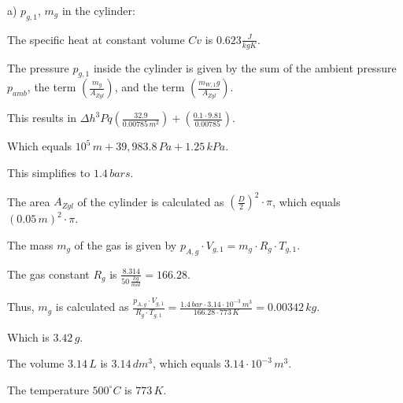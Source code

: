 a) \( p_{g,1} \), \( m_g \) in the cylinder:

The specific heat at constant volume \( Cv \) is \( 0.623 \frac{J}{kgK} \).

The pressure \( p_{g,1} \) inside the cylinder is given by the sum of the ambient pressure \( p_{amb} \), the term \( \left( \frac{m_g}{A_{Zyl}} \right) \), and the term \( \left( \frac{m_{W,1}g}{A_{Zyl}} \right) \).

This results in \( \Delta h^3 Pq \left( \frac{32.9}{0.00785 \, m^2} \right) + \left( \frac{0.1 \cdot 9.81}{0.00785} \right) \).

Which equals \( 10^5 \, m + 39,983.8 \, Pa + 1.25 \, kPa \).

This simplifies to \( 1.4 \, bars \).

The area \( A_{Zyl} \) of the cylinder is calculated as \( \left( \frac{D}{2} \right)^2 \cdot \pi \), which equals \( (0.05 \, m)^2 \cdot \pi \).

The mass \( m_g \) of the gas is given by \( p_{A,g} \cdot V_{g,1} = m_g \cdot R_g \cdot T_{g,1} \).

The gas constant \( R_g \) is \( \frac{8.314}{50 \, \frac{kg}{mol}} = 166.28 \).

Thus, \( m_g \) is calculated as \( \frac{p_{A,g} \cdot V_{g,1}}{R_g \cdot T_{g,1}} = \frac{1.4 \, bar \cdot 3.14 \cdot 10^{-3} \, m^3}{166.28 \cdot 773 \, K} = 0.00342 \, kg \).

Which is \( 3.42 \, g \).

The volume \( 3.14 \, L \) is \( 3.14 \, dm^3 \), which equals \( 3.14 \cdot 10^{-3} \, m^3 \).

The temperature \( 500^\circ C \) is \( 773 \, K \).